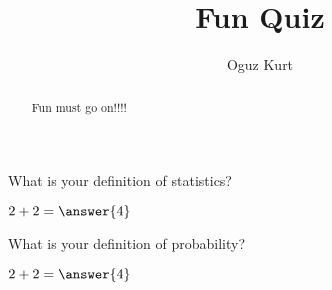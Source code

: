 \documentclass{ximera}
\title{Fun Quiz}
\author{Oguz Kurt}
\begin{document}
\begin{abstract}
Fun must go on!!!!
\end{abstract}
\maketitle

\begin{problem}
What is your definition of statistics?

\begin{freeResponse}
\end{freeResponse}
$2+2=\answer{4}$

\end{problem}

\begin{problem}
What is your definition of probability?

\begin{freeResponse}
\end{freeResponse}

$2+2=\answer{4}$
\end{problem}
\end{document}
